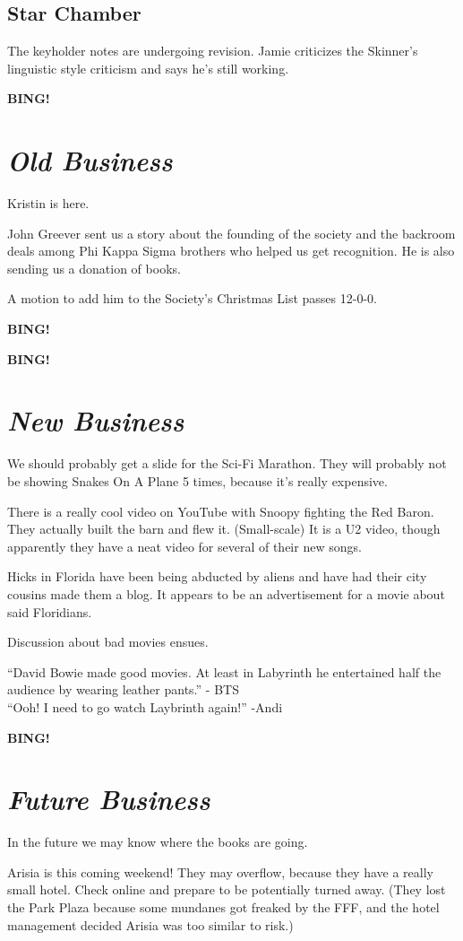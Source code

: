 \documentclass[10pt]{article}
\newcommand{\bing}{{\bf BING!} }
\newcommand{\goto}[1]{\bing \vskip 12pt \section*{{\em{#1}}}}
\begin{document}

\subsection*{Star Chamber}
The keyholder notes are undergoing revision. Jamie criticizes the
Skinner's linguistic style criticism and says he's still working.


\goto{Old Business}
Kristin is here.  

John Greever sent us a story about the founding of the society and the
backroom deals among Phi Kappa Sigma brothers who helped us get
recognition. He is also sending us a donation of books.

A motion to add him to the Society's Christmas List passes 12-0-0.

\bing

\goto{New Business}

We should probably get a slide for the Sci-Fi
Marathon. They will probably not be showing Snakes On A Plane 5 times,
because it's really expensive.

There is a really cool video on YouTube with Snoopy fighting the Red
Baron.  They actually built the barn and flew it. (Small-scale)  It
is a U2 video, though apparently they have a neat video for several of
their new songs.

Hicks in Florida have been being abducted by aliens and have had their
city cousins made them a blog.  It appears to be an advertisement for
a movie about said Floridians.

Discussion about bad movies ensues.

``David Bowie made good movies. At least in Labyrinth he entertained
half the audience by wearing leather pants.'' - BTS\\ 
``Ooh! I need to go watch Laybrinth again!'' -Andi

\goto{Future Business}
In the future we may know where the books are going.

Arisia is this coming weekend! They may overflow, because they have a
really small hotel. Check online and prepare to be potentially turned
away. (They lost the Park Plaza because some mundanes got freaked by
the FFF, and the hotel management decided Arisia was too similar to
risk.)
\end{document}

